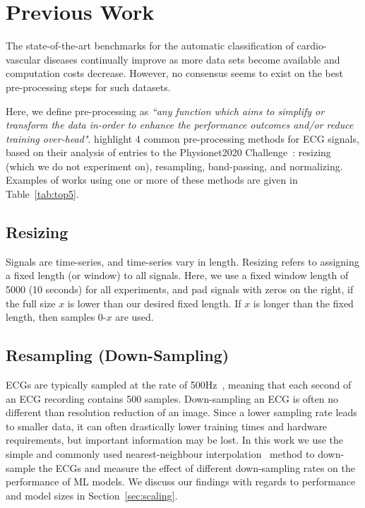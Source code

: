 \documentclass[pmlr,twocolumn]{jmlr}%
\begin{document}
\section{Previous Work}
\label{sec:prevwork}
The state-of-the-art benchmarks for the automatic classification of cardio-vascular diseases continually improve as more data sets become available and computation costs decrease. However, no consensus seems to exist on the best pre-processing steps for such datasets. 

Here, we define pre-processing as \textit{``any function which aims to simplify or transform the data in-order to enhance the performance outcomes and/or reduce training over-head"}. \citet{hong2022practical} highlight 4 common pre-processing methods for ECG signals, based on their analysis of entries to the Physionet2020 Challenge~\citep{goldberger2000physiobank,alday2020classification}: resizing (which we do not experiment on), resampling, band-passing, and normalizing. Examples of works using one or more of these methods are given in Table~\ref{tab:top5}.

\subsection{Resizing} 
Signals are time-series, and time-series vary in length. Resizing refers to assigning a fixed length (or window) to all signals. Here, we use a fixed window length of 5000 (10 seconds) for all experiments, and pad signals with zeros on the right, if the full size $x$ is lower than our desired fixed length. If $x$ is longer than the fixed length, then samples 0-$x$ are used. 

\subsection{Resampling (Down-Sampling)}
ECGs are typically sampled at the rate of 500Hz~\citep{luo2010review,uwaechia2021comprehensive}, meaning that each second of an ECG recording contains 500 samples. Down-sampling an ECG is often no different than resolution reduction of an image. Since a lower sampling rate leads to smaller data, it can often drastically lower training times and hardware requirements, but important information may be lost. In this work we use the simple and commonly used nearest-neighbour interpolation~\citep{rukundo2012nearest} method to down-sample the ECGs and measure the effect of different down-sampling rates on the performance of ML models. We discuss our findings with regards to performance and model sizes in Section~\ref{sec:scaling}. 
\end{document}
